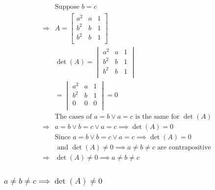 \documentclass{article}
\begin{document}
\begin{equation*}
    \begin{split}
        &\text{Suppose }b=c\\
        \Rightarrow&A=\begin{bmatrix}
            a^2&a&1\\
            b^2&b&1\\
            b^2&b&1\\
        \end{bmatrix}\\
        &\det(A)=\begin{vmatrix}
            a^2&a&1\\
            b^2&b&1\\
            b^2&b&1\\
        \end{vmatrix}\\
        &=\begin{vmatrix}
            a^2&a&1\\
            b^2&b&1\\
            0&0&0\\
        \end{vmatrix}=0\\
        &\text{The cases of } a=b \lor a=c \text{ is the same for }\det(A)\\
        \Rightarrow& a=b\lor b=c\lor a=c\implies \det(A)=0\\
        &\text{Since }a=b\lor b=c\lor a=c\implies \det(A)=0 \\
        &\text{ and }\det(A)\ne0\implies a\ne b\ne c\text{ are contrapositive}\\
        \Rightarrow &\det(A)\ne0\implies a\ne b\ne c\\
    \end{split}
\end{equation*}

\subsubsection{$a\ne b\ne c\implies\det(A)\ne0$}

~
\end{document}
